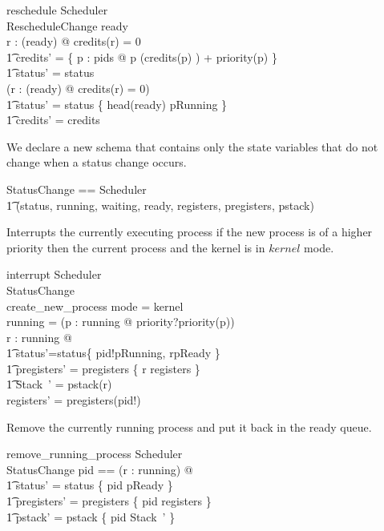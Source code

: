 \documentclass{article}
\begin{document}
\begin{schema}{reschedule}
  \Delta Scheduler\\
  \Xi RescheduleChange
\where
  ready \neq \emptyset\\
  \forall r : \ran(ready) @ credits(r) = 0 \implies\\
    \t1 credits' =
      \{ p : pids @ p \mapsto (credits(p) ) + priority(p) \} \land\\
    \t1 status' = status\\
  \lnot (\forall r : \ran(ready) @ credits(r) = 0) \implies\\
    \t1 status' = status \oplus \{ head(ready) \mapsto pRunning \} \land\\
    \t1 credits' = credits
\end{schema}

We declare a new schema that contains only the state variables that do
not change when a status change occurs.

\begin{zed}
  StatusChange == Scheduler \hide\\
    \t1 (status, running, waiting, ready, registers, pregisters, pstack)
\end{zed}

Interrupts the currently executing process if the new process is of a
higher priority then the current process and the kernel is in $kernel$
mode.

\begin{schema}{interrupt}
  \Delta Scheduler\\
  \Xi StatusChange\\
  create\_new\_process
\where
  mode = kernel\\
  running = \emptyset\lor(\exists p : running @ priority?\geq priority(p))\\
  \exists r : running @\\
    \t1 status'=status\oplus\{ pid!\mapsto pRunning, r\mapsto pReady \}\land\\
    \t1 pregisters' = pregisters \oplus \{ r \mapsto registers \} \land\\
    \t1 \theta Stack~' = pstack(r)\\
  registers' = pregisters(pid!)
\end{schema}

Remove the currently running process and put it back in the ready queue.

\begin{schema}{remove\_running\_process}
  \Delta Scheduler\\
  \Xi StatusChange
\where
  \exists pid == (\mu r : running) @\\
    \t1 status' = status \oplus \{ pid \mapsto pReady \} \land\\
    \t1 pregisters' = pregisters \oplus \{ pid \mapsto registers \} \land\\
    \t1 pstack' = pstack \oplus \{ pid \mapsto \theta Stack~' \}
\end{schema}
\end{document}
